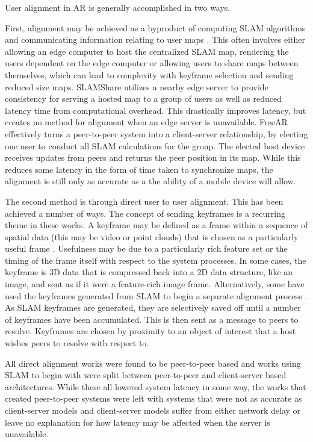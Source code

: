 \documentclass{vgtc}                          %
\begin{document}
User alignment in AR is generally accomplished 
in two ways. 

First, alignment may be achieved as a byproduct of computing SLAM algorithms and communicating 
information relating to user maps \cite{decentralized-slam}. This often 
involves either allowing an edge computer to host the centralized SLAM map, rendering the users dependent on the 
edge computer or allowing users to share maps between themselves, which can lead to complexity with keyframe selection
and sending reduced size maps. SLAMShare\cite{SLAMShare} utilizes a nearby edge server to provide consistency for serving a hosted 
map to a group of users as well as reduced latency time from computational overhead. This drastically improves latency, but 
creates no method for alignment when an edge server is unavailable. FreeAR \cite{BreakingEdgeShackles} effectively turns a 
peer-to-peer system into a client-server relationship, by electing one user to conduct all SLAM calculations for the group. 
The elected host device receives updates from peers and returns the peer position in its map. While this reduces some latency
in the form of time taken to synchronize maps, the alignment is still only as accurate as a the ability of a mobile device will allow.

The second method is through direct user to user alignment. This has been achieved a number of ways. 
The concept of sending keyframes is a recurring theme in these works. A keyframe may be defined as a frame within a 
sequence of spatial data (this may be video or point clouds) that is chosen as a particularly useful frame \cite{BreakingEdgeShackles}. Usefulness may 
be due to a particularly rich feature set or the timing of the frame itself with respect to the system processes. In some cases,
the keyframe is 3D data that is compressed back into a 2D data structure, like an image, and sent as if it were a feature-rich 
image frame\cite{ARLight}. Alternatively, some have used the keyframes generated from SLAM to begin a separate alignment process \cite{communication-efficient-spatially-consistent}.
As SLAM keyframes are generated, they are selectively saved off until a number of keyframes have been accumulated. This is then
sent as a message to peers to resolve. Keyframes are chosen by proximity to an object of interest that a host wishes 
peers to resolve with respect to. 

All direct alignment works were found to be peer-to-peer based and works using SLAM to begin with were split between
peer-to-peer and client-server based architectures. While these all lowered system latency in some way, the works 
that created peer-to-peer systems were left with systems that were not as accurate as client-server models and client-server models 
suffer from either network delay or leave no explanation for how latency may be affected when the server is unavailable.
\end{document}
